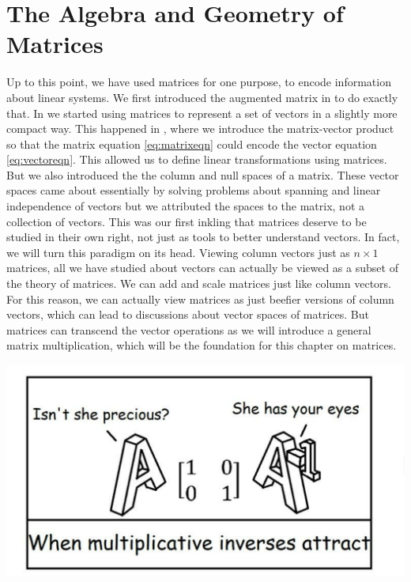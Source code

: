 \chapter{The Algebra and Geometry of Matrices}\label{chap:matrices}

Up to this point, we have used matrices for one purpose, to encode information about linear systems. We first introduced the augmented matrix in  to do exactly that. In  we started using matrices to represent a set of vectors in a slightly more compact way. This happened in , where we introduce the matrix-vector product so that the matrix equation \eqref{eq:matrixeqn} could encode the vector equation \eqref{eq:vectoreqn}. This allowed us to define linear transformations using matrices. \\

But we also introduced the the column and null spaces of a matrix. These vector spaces came about essentially by solving problems about spanning and linear independence of vectors but we attributed the spaces to the matrix, not a collection of vectors. This was our first inkling that matrices deserve to be studied in their own right, not just as tools to better understand vectors. In fact, we will turn this paradigm on its head. Viewing column vectors just as $n\times 1$ matrices, all we have studied about vectors can actually be viewed as a subset of the theory of matrices. We can add and scale matrices just like column vectors. For this reason, we can actually view matrices as just beefier versions of column vectors, which can lead to discussions about vector spaces of matrices. But matrices can transcend the vector operations as we will introduce a general matrix multiplication, which will be the foundation for this chapter on matrices.

\centerline{\includegraphics[scale=0.5]{Chapter3/images/attract.pdf}}

\pagebreak  